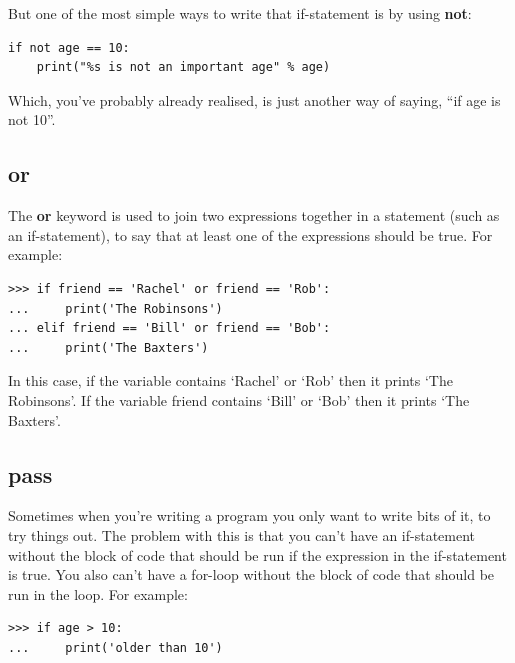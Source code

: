 \noindent
But one of the most simple ways to write that if-statement is by using \textbf{not}:

\begin{listing}
\begin{verbatim}
if not age == 10:
    print("%s is not an important age" % age)
\end{verbatim}
\end{listing}

\noindent
Which, you've probably already realised, is just another way of saying, ``if age is not 10''.

\subsection*{or}

The \textbf{or} keyword is used to join two expressions together in a statement (such as an if-statement), to say that at least one of the expressions should be true.  For example:

\begin{listingignore}
\begin{verbatim}
>>> if friend == 'Rachel' or friend == 'Rob':
...     print('The Robinsons')
... elif friend == 'Bill' or friend == 'Bob':
...     print('The Baxters')
\end{verbatim}
\end{listingignore}

In this case, if the variable  contains `Rachel' or `Rob' then it prints `The Robinsons'.  If the variable friend contains `Bill' or `Bob' then it prints `The Baxters'.

\subsection*{pass}

Sometimes when you're writing a program you only want to write bits of it, to try things out.  The problem with this is that you can't have an if-statement without the block of code that should be run if the expression in the if-statement is true. You also can't have a for-loop without the block of code that should be run in the loop. For example:

\begin{listing}
\begin{verbatim}
>>> if age > 10:
...     print('older than 10')
\end{verbatim}
\end{listing}

